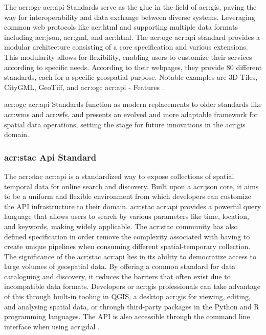 The \gls{acr:ogc} \acrshort{acr:api} Standards serve as the glue in the field of \gls{acr:gis}, paving the way for interoperability and data exchange between diverse systems. Leveraging common web protocols like \acrshort{acr:html} and supporting multiple data formats including \acrshort{acr:json}, \acrshort{acr:gml}, and \acrshort{acr:html}. The \gls{acr:ogc} \acrshort{acr:api} standard provides a modular architecture consisting of a core specification and various extensions. This modularity allows for flexibility, enabling users to customize their services according to specific needs. According to their webpages, they provide 80 different standards, each for a specific geospatial purpose. Notable examples are 3D Tiles, CityGML, GeoTiff, and \acrshort{acr:ogc} \acrshort{acr:api} - Features \citep{ogcOGCStandards2023}.

\acrshort{acr:ogc} \acrshort{acr:api} Standards function as modern replacements to older standards like \acrshort{acr:wms} and \acrshort{acr:wfs}, and presents an evolved and more adaptable framework for spatial data operations, setting the stage for future innovations in the \acrshort{acr:gis} domain.

\subsubsection[STAC Api Standard]{\acrshort{acr:stac} Api Standard}\label{subsubsec:stac}

The \gls{acr:stac} \acrshort{acr:api} is a standardized way to expose collections of spatial temporal data for online search and discovery. Built upon a \acrshort{acr:json} core, it aims to be a uniform and flexible environment from which developers can customize the API infrastructure to their domain. \gls{acr:stac} \acrshort{acr:api} provides a powerful query language that allows users to search by various parameters like time, location, and keywords, making widely applicable. The \acrshort{acr:stac} community has also defined specification in order remove the complexity associated with having to create unique pipelines when consuming different spatial-temporary collection. The significance of the \gls{acr:stac} \acrshort{acr:api} lies in its ability to democratize access to large volumes of geospatial data. By offering a common standard for data cataloguing and discovery, it reduces the barriers that often exist due to incompatible data formats. Developers or \acrshort{acr:gis} professionals can take advantage of this through built-in tooling in QGIS, a desktop \gls{acr:gis} for viewing, editing, and analysing spatial data, or through third-party packages in the Python and R programming languages. The API is also accessible through the command line interface when using \acrshort{acr:gdal} \citep{STACTutorials}.

